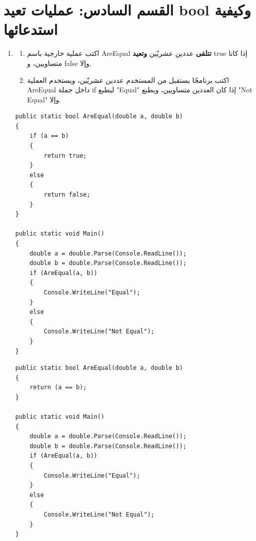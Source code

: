 \documentclass[14pt]{extarticle}
\begin{document}
\filbreak
\section*{القسم السادس: عمليات تعيد \textenglish{bool} وكيفية استدعائها}

\begin{enumerate}[resume, itemsep=2em]

\item
\begin{enumerate}
    \item اكتب عملية خارجية باسم \textenglish{AreEqual} \textbf{تتلقى} عددين عشريّين \textbf{وتعيد} \textenglish{true} إذا كانا متساويين، و \textenglish{false} وإلا.
    \item اكتب برنامجًا يستقبل من المستخدم عددين عشريّين، ويستخدم العملية \textenglish{AreEqual} داخل جملة \textenglish{if} ليطبع \textenglish{"Equal"} إذا كان العددين متساويين، ويطبع \textenglish{"Not Equal"} وإلا.
\end{enumerate}
\ifwithsols
\begin{boxSolution}[1]
\begin{english}
\begin{verbatim}
public static bool AreEqual(double a, double b)
{
    if (a == b)
    {
        return true;
    }
    else
    {
        return false;
    }
}

public static void Main()
{
    double a = double.Parse(Console.ReadLine());
    double b = double.Parse(Console.ReadLine());
    if (AreEqual(a, b))
    {
        Console.WriteLine("Equal");
    }
    else
    {
        Console.WriteLine("Not Equal");
    }
}
\end{verbatim}
\end{english}
\end{boxSolution}

\filbreak

\begin{boxSolution}[2]
\begin{english}
\begin{verbatim}
public static bool AreEqual(double a, double b)
{
    return (a == b);
}

public static void Main()
{
    double a = double.Parse(Console.ReadLine());
    double b = double.Parse(Console.ReadLine());
    if (AreEqual(a, b))
    {
        Console.WriteLine("Equal");
    }
    else
    {
        Console.WriteLine("Not Equal");
    }
}
\end{verbatim}
\end{english}
\end{boxSolution}
\fi
\filbreak


\end{enumerate}
\end{document}
